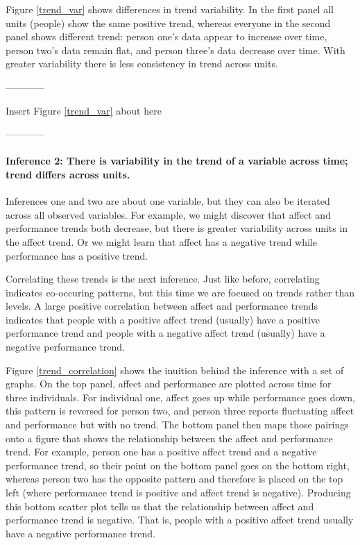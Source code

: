 \documentclass[english,,man]{apa6}
\let\oldparagraph\paragraph
\renewcommand{\paragraph}[1]{\oldparagraph{#1}\mbox{}}
\theoremstyle{definition}
\theoremstyle{definition}
\theoremstyle{definition}
\theoremstyle{remark}
\begin{document}
Figure \ref{trend_var} shows differences in trend variability. In the
first panel all units (people) show the same positive trend, whereas
everyone in the second panel shows different trend: person one's data
appear to increase over time, person two's data remain flat, and person
three's data decrease over time. With greater variability there is less
consistency in trend across units.

\begin{center}

------------

Insert Figure \ref{trend_var} about here

------------

\end{center}

\hypertarget{inference-2-there-is-variability-in-the-trend-of-a-variable-across-time-trend-differs-across-units.}{%
\paragraph{Inference 2: There is variability in the trend of a variable
across time; trend differs across
units.}\label{inference-2-there-is-variability-in-the-trend-of-a-variable-across-time-trend-differs-across-units.}}

Inferences one and two are about one variable, but they can also be
iterated across all observed variables. For example, we might discover
that affect and performance trends both decrease, but there is greater
variability across units in the affect trend. Or we might learn that
affect has a negative trend while performance has a positive trend.

Correlating these trends is the next inference. Just like before,
correlating indicates co-occuring patterns, but this time we are focused
on trends rather than levels. A large positive correlation between
affect and performance trends indicates that people with a positive
affect trend (usually) have a positive performance trend and people with
a negative affect trend (usually) have a negative performance trend.

Figure \ref{trend_correlation} shows the inuition behind the inference
with a set of graphs. On the top panel, affect and performance are
plotted across time for three individuals. For individual one, affect
goes up while performance goes down, this pattern is reversed for person
two, and person three reports fluctuating affect and performance but
with no trend. The bottom panel then maps those pairings onto a figure
that shows the relationship between the affect and performance trend.
For example, person one has a positive affect trend and a negative
performance trend, so their point on the bottom panel goes on the bottom
right, whereas person two has the opposite pattern and therefore is
placed on the top left (where performance trend is positive and affect
trend is negative). Producing this bottom scatter plot tells us that the
relationship between affect and performance trend is negative. That is,
people with a positive affect trend usually have a negative performance
trend.
\end{document}
